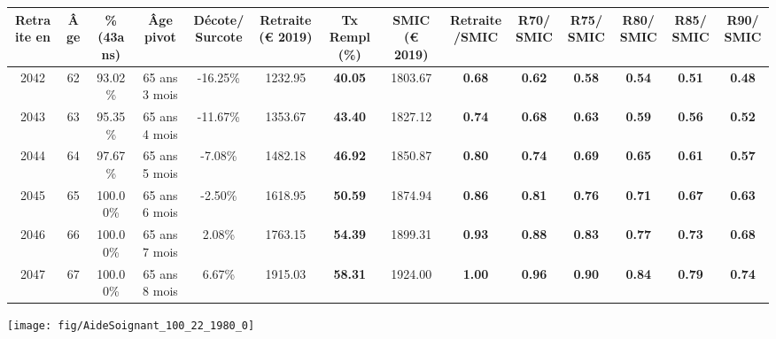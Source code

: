 \begin{adjustbox}{max width=\textwidth} 
\begin{tabular}[htb]{|c|c||c|c|c||c|c||c|c||c|c|c|c|c|} 
\hline 
 Retraite en &  Âge &  \%(43ans) &  Âge pivot &  Décote/Surcote &  Retraite (\euro{} 2019) &  Tx Rempl(\%) &  SMIC (\euro{} 2019) &  Retraite/SMIC &  R70/SMIC &  R75/SMIC &  R80/SMIC &  R85/SMIC &  R90/SMIC \\ 
\hline \hline 
 2042 &  62 &  93.02\% &  65 ans 3 mois &  -16.25\% &  1232.95 &  {\bf 40.05} &  1803.67 &  {\bf {\color{red} 0.68}} &  {\bf {\color{red} 0.62}} &  {\bf {\color{red} 0.58}} &  {\bf {\color{red} 0.54}} &  {\bf {\color{red} 0.51}} &  {\bf {\color{red} 0.48}} \\ 
\hline 
 2043 &  63 &  95.35\% &  65 ans 4 mois &  -11.67\% &  1353.67 &  {\bf 43.40} &  1827.12 &  {\bf {\color{red} 0.74}} &  {\bf {\color{red} 0.68}} &  {\bf {\color{red} 0.63}} &  {\bf {\color{red} 0.59}} &  {\bf {\color{red} 0.56}} &  {\bf {\color{red} 0.52}} \\ 
\hline 
 2044 &  64 &  97.67\% &  65 ans 5 mois &  -7.08\% &  1482.18 &  {\bf 46.92} &  1850.87 &  {\bf {\color{red} 0.80}} &  {\bf {\color{red} 0.74}} &  {\bf {\color{red} 0.69}} &  {\bf {\color{red} 0.65}} &  {\bf {\color{red} 0.61}} &  {\bf {\color{red} 0.57}} \\ 
\hline 
 2045 &  65 &  100.00\% &  65 ans 6 mois &  -2.50\% &  1618.95 &  {\bf 50.59} &  1874.94 &  {\bf {\color{red} 0.86}} &  {\bf {\color{red} 0.81}} &  {\bf {\color{red} 0.76}} &  {\bf {\color{red} 0.71}} &  {\bf {\color{red} 0.67}} &  {\bf {\color{red} 0.63}} \\ 
\hline 
 2046 &  66 &  100.00\% &  65 ans 7 mois &  2.08\% &  1763.15 &  {\bf 54.39} &  1899.31 &  {\bf {\color{red} 0.93}} &  {\bf {\color{red} 0.88}} &  {\bf {\color{red} 0.83}} &  {\bf {\color{red} 0.77}} &  {\bf {\color{red} 0.73}} &  {\bf {\color{red} 0.68}} \\ 
\hline 
 2047 &  67 &  100.00\% &  65 ans 8 mois &  6.67\% &  1915.03 &  {\bf 58.31} &  1924.00 &  {\bf {\color{red} 1.00}} &  {\bf {\color{red} 0.96}} &  {\bf {\color{red} 0.90}} &  {\bf {\color{red} 0.84}} &  {\bf {\color{red} 0.79}} &  {\bf {\color{red} 0.74}} \\ 
\hline 
\hline 
\end{tabular} 
\end{adjustbox} 
 
 \vspace{0.1cm} 

 {\hspace{-2.2cm}\texttt{[image: fig/AideSoignant\_100\_22\_1980\_0]}} 

